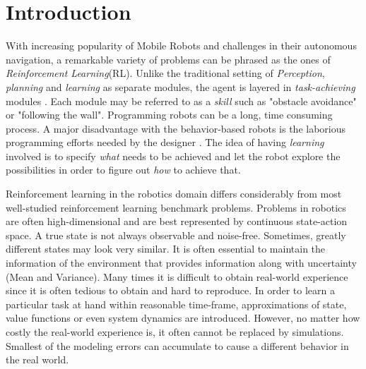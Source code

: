 \documentclass[12pt]{report}
\begin{document}
\tableofcontents
\pagebreak

\listoffigures
\pagebreak



\pagestyle{myheadings}



\chapter{Introduction} %

\label{introduction} %

With increasing popularity of Mobile Robots and challenges in their autonomous navigation, a remarkable variety of problems can be phrased as the ones of \textit{Reinforcement Learning}(RL). Unlike the traditional setting of \textit{Perception}, \textit{planning} and \textit{learning} as separate modules, the agent is layered in \textit{task-achieving} modules \cite{mahadevan1992automatic}. Each module may be referred to as a \textit{skill} such as "obstacle avoidance" or "following the wall". Programming robots can be a long, time consuming process. A major disadvantage with the behavior-based robots is the laborious programming efforts needed by the designer \cite{mahadevan1992automatic} \cite{smart2002effective}. The idea of having \textit{learning} involved is to specify \textit{what} needs to be achieved and let the robot explore the possibilities in order to figure out \textit{how} to achieve that.\par

Reinforcement learning in the robotics domain differs considerably from most well-studied reinforcement
learning benchmark problems. Problems in robotics are often high-dimensional and are best represented by continuous state-action space. A true state is not always observable and noise-free. Sometimes, greatly different states may look very similar. It is often essential to maintain the information of the environment that provides information along with uncertainty (Mean and Variance). Many times it is difficult to obtain real-world experience since it is often tedious to obtain and hard to reproduce. In order to learn a particular task at hand within reasonable time-frame, approximations of state, value functions or even system dynamics are introduced.  However, no matter how costly the real-world experience is, it often cannot be replaced by simulations. Smallest of the modeling errors can accumulate to cause a different behavior in the real world.\par 
\end{document}

